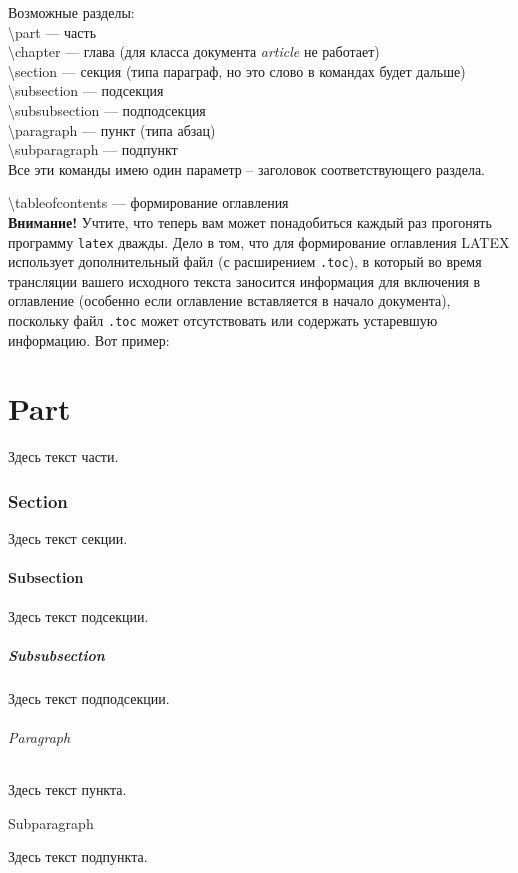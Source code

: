 \noindent
Возможные разделы:\\
\textbackslash part --- часть\\
\textbackslash chapter --- глава (для класса документа \textit{article} не работает)\\
\textbackslash section --- секция (типа параграф, но это слово в командах будет дальше)\\
\textbackslash subsection --- подсекция\\
\textbackslash subsubsection --- подподсекция\\
\textbackslash paragraph --- пункт (типа абзац)\\
\textbackslash subparagraph --- подпункт\\
Все эти команды имею один параметр -- заголовок соответствующего раздела.
\medskip

\noindent
\textbackslash tableofcontents --- формирование оглавления\\
\textbf{Внимание!} Учтите, что теперь вам может понадобиться каждый раз прогонять программу \texttt{latex} дважды. Дело в том, что для формирование оглавления LATEX использует дополнительный файл (с расширением \texttt{.toc}), в который во время трансляции вашего исходного текста заносится информация для включения в оглавление (особенно если оглавление вставляется в начало документа), поскольку файл \texttt{.toc} может отсутствовать или содержать устаревшую информацию. Вот пример:
\medskip

\tableofcontents

\part{Part}
Здесь текст части.
\section{Section}
Здесь текст секции.
\subsection{Subsection}
Здесь текст подсекции.
\subsubsection{Subsubsection}
Здесь текст подподсекции.
\paragraph{Paragraph}
Здесь текст пункта.
\subparagraph{Subparagraph}
Здесь текст подпункта.
\medskip

